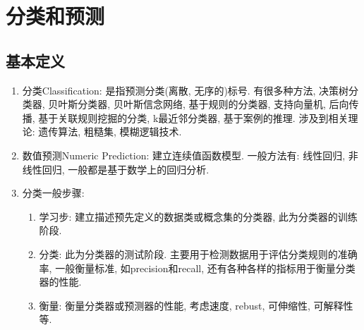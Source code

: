 \documentclass[a4paper,10pt,english]{article}
\begin{document}
\clearpage
\section{分类和预测}
\subsection{基本定义}
\begin{enumerate}
\item {分类Classification:}
是指预测分类(离散, 无序的)标号. 有很多种方法, 决策树分类器, 贝叶斯分类器, 贝叶斯信念网络, 基于规则的分类器, 支持向量机, 后向传播, 基于关联规则挖掘的分类, k最近邻分类器, 基于案例的推理. 涉及到相关理论: 遗传算法, 粗糙集, 模糊逻辑技术.
\item {数值预测Numeric Prediction:}
建立连续值函数模型. 一般方法有: 线性回归, 非线性回归, 一般都是基于数学上的回归分析.
\item {分类一般步骤:}
\begin{enumerate}
\item {学习步:} 
建立描述预先定义的数据类或概念集的分类器, 此为分类器的训练阶段.
\item {分类:}
此为分类器的测试阶段. 主要用于检测数据用于评估分类规则的准确率, 一般衡量标准, 如precision和recall, 还有各种各样的指标用于衡量分类器的性能.
\item {衡量:}
衡量分类器或预测器的性能, 考虑速度, rebust, 可伸缩性, 可解释性等.
\end{enumerate}
\end{enumerate}
\end{document}
